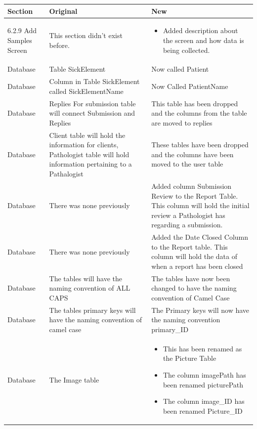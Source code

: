 \documentclass[onecolumn, draftclsnofoot,10pt, compsoc]{IEEEtran}
\begin{document}
\begin{table}
\begin{tabularx}{\textwidth}{|>{\setlength\hsize{.8\hsize}\setlength\linewidth{\hsize}}X|>{\setlength\hsize{1.1\hsize}\setlength\linewidth{\hsize}}X|>{\setlength\hsize{1.1\hsize}\setlength\linewidth{\hsize}}X|}
\hline
Section & Original & New \\
\hline
6.2.9 Add Samples Screen
&
This section didn't exist before.
&
\begin{itemize}
    \item Added description about the screen and how data is being collected.
\end{itemize}
\\
 \hline %
 Database & Table SickElement & Now called Patient\\ 
 \hline
 Database & Column in Table SickElement called SickElementName & Now Called PatientName\\
 \hline
 Database & Replies For submission table will connect Submission and Replies & This table has been dropped and the columns from the table are moved to replies\\
 \hline
 Database & Client table will hold the information for clients, Pathologist table will hold information pertaining to a Pathalogist  & These tables have been dropped and the columns have been moved to the user table\\
\hline Database & There was none previously & Added column Submission Review to the Report Table. This column will hold the initial review a Pathologist has regarding a submission.\\
\hline Database & There was none previously & Added the Date Closed Column to the Report table. This column will hold the data of when a report has been closed\\
\hline Database & The tables will have the naming convention of ALL CAPS & The tables have now been changed to have the naming convention of Camel Case\\
\hline Database & The tables primary keys will have the naming convention of camel case & The Primary keys will now have the naming convention primary\_ID\\
\hline Database & The Image table 
& 
\begin{itemize}
    \item This has been renamed as the Picture Table
    \item The column imagePath has been renamed picturePath
    \item The column image\_ID has been renamed Picture\_ID

\end{itemize}
\end{tabularx}
\end{table}
\end{document}
